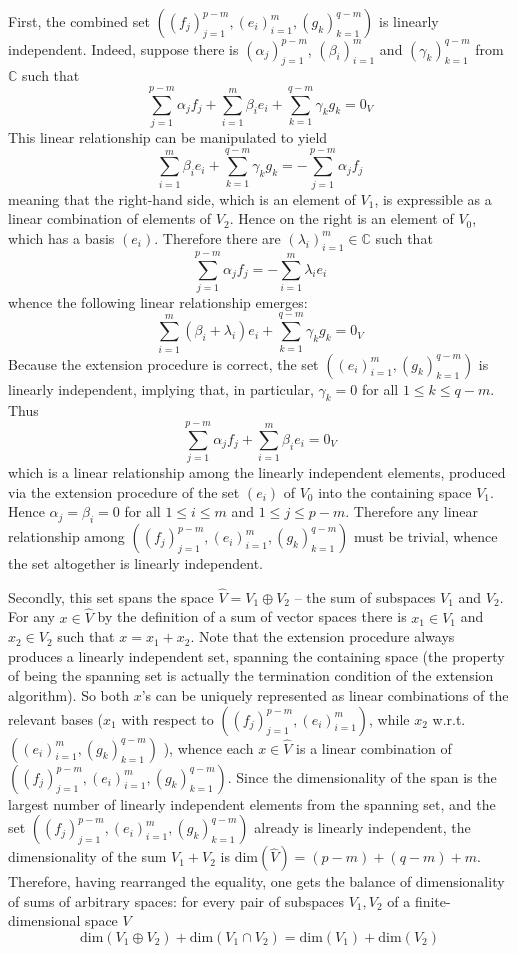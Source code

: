\documentclass[a4paper]{article}
\newcommand{\brac}[1]{\ensuremath{\left( #1 \right)}}
\newcommand{\Dim}[1]{\ensuremath{\text{dim}\brac{ #1 }}}
\begin{document}
First, the combined set $\brac{\brac{f_j}_{j=1}^{p-m}, \brac{e_i}_{i=1}^m, \brac{g_k}_{k=1}^{q-m}}$ is linearly independent. Indeed, suppose there is $\brac{\alpha_j}_{j=1}^{p-m}$, $\brac{\beta_i}_{i=1}^m$ and $\brac{\gamma_k}_{k=1}^{q-m}$ from $\mathbb{C}$ such that\[\sum_{j=1}^{p-m} \alpha_j f_j + \sum_{i=1}^m \beta_i e_i + \sum_{k=1}^{q-m} \gamma_k g_k = 0_V\] This linear relationship can be manipulated to yield\[\sum_{i=1}^m \beta_i e_i + \sum_{k=1}^{q-m} \gamma_k g_k = -\sum_{j=1}^{p-m} \alpha_j f_j\] meaning that the right-hand side, which is an element of $V_1$, is expressible as a linear combination of elements of $V_2$. Hence on the right is an element of $V_0$, which has a basis $\brac{e_i}$. Therefore there are $\brac{\lambda_i}_{i=1}^m\in \mathbb{C}$ such that \[\sum_{j=1}^{p-m} \alpha_j f_j = -\sum_{i=1}^m \lambda_i e_i\] whence the following linear relationship emerges: \[\sum_{i=1}^m \brac{\beta_i+\lambda_i} e_i + \sum_{k=1}^{q-m} \gamma_k g_k = 0_V\] Because the extension procedure is correct, the set $\brac{\brac{e_i}_{i=1}^m, \brac{g_k}_{k=1}^{q-m}}$ is linearly independent, implying that, in particular, $\gamma_k = 0$ for all $1\leq k\leq q-m$. Thus\[\sum_{j=1}^{p-m} \alpha_j f_j + \sum_{i=1}^m \beta_i e_i = 0_V\] which is a linear relationship among the linearly independent elements, produced via the extension procedure of the set $\brac{e_i}$ of $V_0$ into the containing space $V_1$. Hence $\alpha_j = \beta_i = 0$ for all $1\leq i \leq m$ and $1\leq j \leq p-m$. Therefore any linear relationship among $\brac{\brac{f_j}_{j=1}^{p-m}, \brac{e_i}_{i=1}^m, \brac{g_k}_{k=1}^{q-m}}$ must be trivial, whence the set altogether is linearly independent.

Secondly, this set spans the space $\hat{V} = V_1\oplus V_2$ -- the sum of subspaces $V_1$ and $V_2$. For any $x\in \hat{V}$ by the definition of a sum of vector spaces there is $x_1 \in V_1$ and $x_2\in V_2$ such that $x = x_1+x_2$. Note that the extension procedure always produces a linearly independent set, spanning the containing space (the property of being the spanning set is actually the termination condition of the extension algorithm). So both $x$'s can be uniquely represented as linear combinations of the relevant bases ($x_1$ with respect to $\brac{\brac{f_j}_{j=1}^{p-m}, \brac{e_i}_{i=1}^m}$, while $x_2$ w.r.t. $\brac{\brac{e_i}_{i=1}^m, \brac{g_k}_{k=1}^{q-m}}$ ), whence each $x\in \hat{V}$ is a linear combination of $\brac{\brac{f_j}_{j=1}^{p-m}, \brac{e_i}_{i=1}^m, \brac{g_k}_{k=1}^{q-m}}$. Since the dimensionality of the span is the largest number of linearly independent elements from the spanning set, and the set $\brac{\brac{f_j}_{j=1}^{p-m}, \brac{e_i}_{i=1}^m, \brac{g_k}_{k=1}^{q-m}}$ already is linearly independent, the dimensionality of the sum $V_1+V_2$ is $\Dim{\hat{V}} = \brac{p-m} + \brac{q-m} + m$. Therefore, having rearranged the equality, one gets the balance of dimensionality of sums of arbitrary spaces: for every pair of subspaces $V_1, V_2$ of a finite-dimensional space $V$ \[\Dim{V_1\oplus V_2} + \Dim{V_1\cap V_2} = \Dim{V_1} + \Dim{V_2}\]
\end{document}
